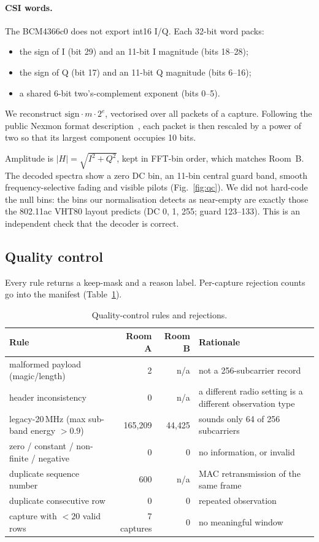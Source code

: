\documentclass[11pt,a4paper]{article}
\begin{document}
\paragraph{CSI words.} The BCM4366c0 does not export int16 I/Q. Each 32-bit word packs:
\begin{itemize}
  \item the sign of I (bit 29) and an 11-bit I magnitude (bits 18--28);
  \item the sign of Q (bit 17) and an 11-bit Q magnitude (bits 6--16);
  \item a shared 6-bit two's-complement exponent (bits 0--5).
\end{itemize}
We reconstruct $\text{sign}\cdot m\cdot2^{e}$, vectorised over all packets of a capture. Following the public Nexmon format description~\cite{nexmon}, each packet is then rescaled by a power of two so that its largest component occupies 10 bits.

Amplitude is $|H|=\sqrt{I^2+Q^2}$, kept in FFT-bin order, which matches Room~B. The decoded spectra show a zero DC bin, an 11-bin central guard band, smooth frequency-selective fading and visible pilots (Fig.~\ref{fig:qc}). We did not hard-code the null bins: the bins our normalisation detects as near-empty are exactly those the 802.11ac VHT80 layout predicts (DC 0, 1, 255; guard 123--133). This is an independent check that the decoder is correct.

\subsection{Quality control}
Every rule returns a keep-mask and a reason label. Per-capture rejection counts go into the manifest (Table~\ref{tab:qc}).

\begin{table}[H]
\centering\small
\caption{Quality-control rules and rejections.}
\label{tab:qc}
\begin{tabular}{p{5.2cm}rrp{5.4cm}}
\toprule
Rule & Room A & Room B & Rationale\\
\midrule
malformed payload (magic/length) & 2 & n/a & not a 256-subcarrier record\\
header inconsistency & 0 & n/a & a different radio setting is a different observation type\\
legacy-20\,MHz (max sub-band energy $>0.9$) & 165{,}209 & 44{,}425 & sounds only 64 of 256 subcarriers\\
zero / constant / non-finite / negative & 0 & 0 & no information, or invalid\\
duplicate sequence number & 600 & n/a & MAC retransmission of the same frame\\
duplicate consecutive row & 0 & 0 & repeated observation\\
capture with $<20$ valid rows & 7 captures & 0 & no meaningful window\\
\bottomrule
\end{tabular}
\end{table}
\end{document}
